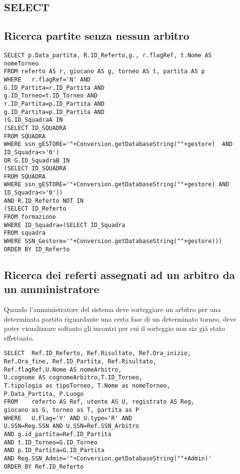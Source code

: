 \subsection{SELECT}

\subsection*{Ricerca partite senza nessun arbitro}

\begin{lstlisting}
SELECT p.Data_partita, R.ID_Referto,g., r.flagRef, t.Nome AS nomeTorneo
FROM referto AS r, giocano AS g, torneo AS t, partita AS p
WHERE 	r.flagRef='N' AND
G.ID_Partita=r.ID_Partita AND
g.ID_Torneo=t.ID_Torneo AND
r.ID_Partita=p.ID_Partita AND
g.ID_Partita=p.ID_Partita AND
(G.ID_SquadraA IN
(SELECT ID_SQUADRA
FROM SQUADRA 
WHERE ssn_gESTORE='"+Conversion.getDatabaseString(""+gestore)  AND
ID_Squadra<>'0')
OR G.ID_SquadraB IN
(SELECT ID_SQUADRA
FROM SQUADRA
WHERE ssn_gESTORE='"+Conversion.getDatabaseString(""+gestore) AND
ID_Squadra<>'0')) 
AND R.ID_Referto NOT IN
(SELECT ID_Referto
FROM formazione 
WHERE ID_Squadra=(SELECT ID_Squadra
FROM squadra
WHERE SSN_Gestore='"+Conversion.getDatabaseString(""+gestore)))
ORDER BY ID_Referto
\end{lstlisting}

\subsection*{Ricerca dei referti assegnati ad un arbitro da un amministratore}
Quando l'amministratore del sistema deve sorteggiare un arbitro per una determinata partita riguardante una certa fase di un determinato torneo, deve poter visualizzare soltanto gli incontri per cui il sorteggio non sia già stato effettuato.

\begin{lstlisting}
SELECT 	Ref.ID_Referto, Ref.Risultato, Ref.Ora_inizio,
Ref.Ora_fine, Ref.ID_Partita, Ref.Risultato,
Ref.flagRef,U.Nome AS nomeArbitro,
U.cognome AS cognomeArbitro,T.ID_Torneo,
T.tipologia as tipoTorneo, T.Nome as nomeTorneo,
P.Data_Partita, P.Luogo
FROM 	referto AS Ref, utente AS U, registrato AS Reg,
giocano as G, torneo as T, partita as P
WHERE	U.Flag='Y' AND U.type='R' AND
U.SSN=Reg.SSN AND U.SSN=Ref.SSN_Arbitro
AND g.id_partita=Ref.ID_Partita
AND t.ID_Torneo=G.ID_Torneo
AND p.ID_Partita=G.ID_Partita
AND Reg.SSN_Admin='"+Conversion.getDatabaseString(""+Admin)'
ORDER BY Ref.ID_Referto 
\end{lstlisting}

